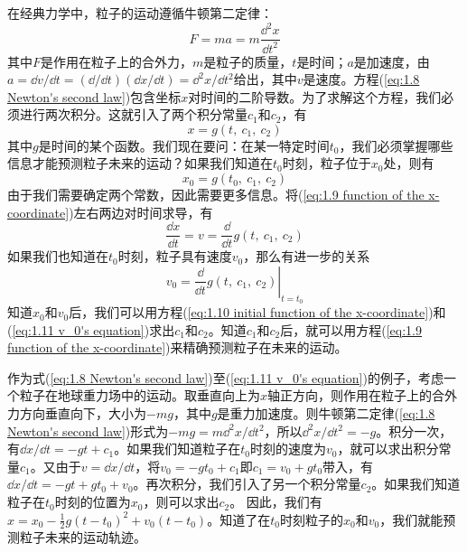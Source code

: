 	在经典力学中，粒子的运动遵循牛顿第二定律：
	\begin{equation}
		\boxed{F = ma = m \frac{\dd ^2x}{\dd t^2}}
		\label{eq:1.8 Newton's second law}
	\end{equation}
	其中$F$是作用在粒子上的合外力，$m$是粒子的质量，$t$是时间；$a$是加速度，由$a = \dd v / \dd t = \left(\dd / \dd t\right)\left(\dd x / \dd t\right) = \dd ^2x / \dd t^2$给出，其中$v$是速度。方程(\ref{eq:1.8 Newton's second law})包含坐标$x$对时间的二阶导数。为了求解这个方程，我们必须进行两次积分。这就引入了两个积分常量$c_1$和$c_2$，有
	\begin{equation}
		x=g\left(t,\:c_1,\:c_2\right)
		\label{eq:1.9 function of the x-coordinate}
	\end{equation}
	其中$g$是时间的某个函数。我们现在要问：在某一特定时间$t_0$，我们必须掌握哪些信息才能预测粒子未来的运动？如果我们知道在$t_0$时刻，粒子位于$x_0$处，则有
	\begin{equation}
		x_0=g\left(t_0,\:c_1,\:c_2\right)
		\label{eq:1.10 initial function of the x-coordinate}
	\end{equation}
	由于我们需要确定两个常数，因此需要更多信息。将(\ref{eq:1.9 function of the x-coordinate})左右两边对时间求导，有
	\begin{equation*}
		\frac{\dd x }{\dd t} = v = \frac{\dd }{\dd t} g\left(t,\:c_1,\:c_2\right)
		\label{eq*:derivative of g function with respect to time}
	\end{equation*}
	如果我们也知道在$t_0$时刻，粒子具有速度$v_0$，那么有进一步的关系
	\begin{equation}
		v_0 = \left. \frac{\dd }{\dd t} g(t, \:c_1, \:c_2)\right|_{t = t_0}
		\label{eq:1.11 v_0's equation}
	\end{equation}
	知道$x_0$和$v_0$后，我们可以用方程(\ref{eq:1.10 initial function of the x-coordinate})和(\ref{eq:1.11 v_0's equation})求出$c_1$和$c_2$。知道$c_1$和$c_2$后，就可以用方程(\ref{eq:1.9 function of the x-coordinate})来精确预测粒子在未来的运动。

	作为式(\ref{eq:1.8 Newton's second law})至(\ref{eq:1.11 v_0's equation})的例子，考虑一个粒子在地球重力场中的运动。取垂直向上为$x$轴正方向，则作用在粒子上的合外力方向垂直向下，大小为$-mg$，其中$g$是重力加速度。则牛顿第二定律(\ref{eq:1.8 Newton's second law})形式为$-mg=m\dd ^2x/\dd t^2$，所以$\dd ^2x/\dd t^2=-g$。积分一次，有$\dd x/\dd t=-gt+c_1$。如果我们知道粒子在$t_0$时刻的速度为$v_0$，就可以求出积分常量$c_1$。又由于$v=\dd x/\dd t$，将$v_0=-gt_0+c_1$即$c_1=v_0+gt_0$带入，有$\dd x/\dd t=-gt+gt_0+v_0$。再次积分，我们引入了另一个积分常量$c_2$。如果我们知道粒子在$t_0$时刻的位置为$x_0$，则可以求出$c_2$。	因此，我们有$x=x_0-\frac{1}{2}g\left(t-t_0\right)^2+v_0\left(t-t_0\right)$。知道了在$t_0$时刻粒子的$x_0$和$v_0$，我们就能预测粒子未来的运动轨迹。

